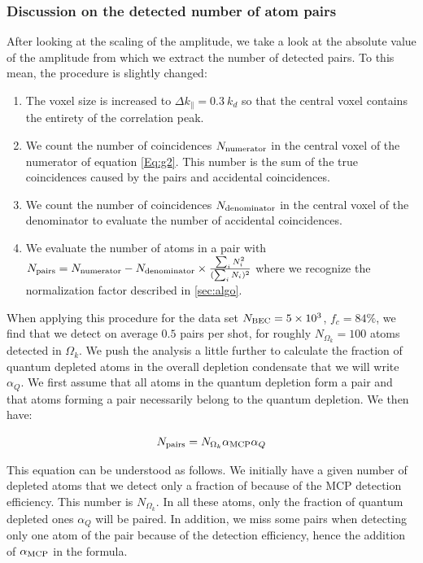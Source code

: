 \subsubsection{Discussion on the detected number of atom pairs}

After looking at the scaling of the amplitude, we take a look at the absolute value of the amplitude from which we extract the number of detected \kmk pairs. To this mean, the procedure is slightly changed:

\begin{enumerate}
    \item The voxel size is increased to $\Delta k_{\parallel} = 0.3 \ k_d$ so that the central voxel contains the entirety of the correlation peak.
    \item We count the number of coincidences $N_{\rm{numerator}}$ in the central voxel of the numerator of equation \ref{Eq:g2}. This number is the sum of the true coincidences caused by the \kmk pairs and accidental coincidences.
    \item  We count the number of coincidences $N_{\rm{denominator}}$ in the central voxel of the denominator to evaluate the number of accidental coincidences.
    \item We evaluate the number of atoms in a \kmk pair with $N_{\rm{pairs}}=N_{\rm{numerator}} - N_{\rm{denominator}} \times \frac{\sum_i N_i^2}{(\sum_i N_i)^2}$ where we recognize the normalization factor described in \ref{sec:algo}.
\end{enumerate}

When applying this procedure for the data set $N_{\rm{BEC}}=5 \times 10^3$, $f_c=84 \%$, we find that we detect on average $0.5$ pairs per shot, for roughly $N_{\Omega_k}=100$ atoms detected in $\Omega_k$. We push the analysis a little further to calculate the fraction of quantum depleted atoms in the overall depletion condensate that we will write $\alpha_Q$. We first assume that all atoms in the quantum depletion form a \kmk pair and that atoms forming a \kmk pair necessarily belong to the quantum depletion. We then have:

\begin{equation}
    N_{\rm{pairs}}= N_{\Omega_k} \alpha_{\rm{MCP}} \alpha_Q
    \label{eq:Npairs}
\end{equation}

This equation can be understood as follows. We initially have a given number of depleted atoms that we detect only a fraction of because of the MCP detection efficiency. This number is $N_{\Omega_k}$. In all these atoms, only the fraction of quantum depleted ones $\alpha_Q$ will be \kmk paired. In addition, we miss some pairs when detecting only one atom of the pair because of the detection efficiency, hence the addition of $\alpha_{\rm{MCP}}$ in the formula.

